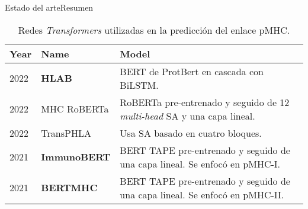 \documentclass[10pt]{beamer}
\newcommand{\1}{
	\setbeamertemplate{background}{
		\texttt{[image: img/1]}
		\tikz[overlay] \fill[fill opacity=0.75,fill=white] (0,0) rectangle (-\paperwidth,\paperheight);
	}
}
\begin{document}
\begin{frame}{Estado del arte}{Resumen}
	
	
	\begin{table}[]
		\caption{Redes \textit{Transformers} utilizadas en la predicción del enlace pMHC.}
		\label{tab:transformes}
		\setlength{\tabcolsep}{0.6em} %
		{\renewcommand{\arraystretch}{1.6}%
			
			\begin{footnotesize}
				\begin{tabular}{p{1cm}p{1.5cm}p{7cm}}
					\multicolumn{1}{l}{\textbf{Year}}                                   & \textbf{Name}                       & \textbf{Model}     \\  \hline
					
					2022\cite{zhang2022hlab}&	\textbf{HLAB}&	BERT de ProtBert en cascada con BiLSTM.	\\
					
					2022\cite{wang2022mhcroberta}          & MHC RoBERTa             &  RoBERTa  pre-entrenado y seguido de 12 \textit{multi-head} SA y una capa lineal.                                                                                     \\
					2022\cite{chu2022transformer}          & TransPHLA                     & Usa SA basado en cuatro bloques. \\
					
					2021\cite{gasser2021interpreting}  & \textbf{ImmunoBERT}                              & BERT TAPE pre-entrenado y seguido de una capa lineal. Se enfocó en pMHC-I.  \\
					
					2021\cite{cheng2021bertmhc}             & \textbf{BERTMHC}                            & BERT TAPE pre-entrenado y seguido de una capa lineal. Se enfocó en pMHC-II. \\
					
				\end{tabular}
			\end{footnotesize}
		}
	\end{table}
	
	
\end{frame}
\end{document}

